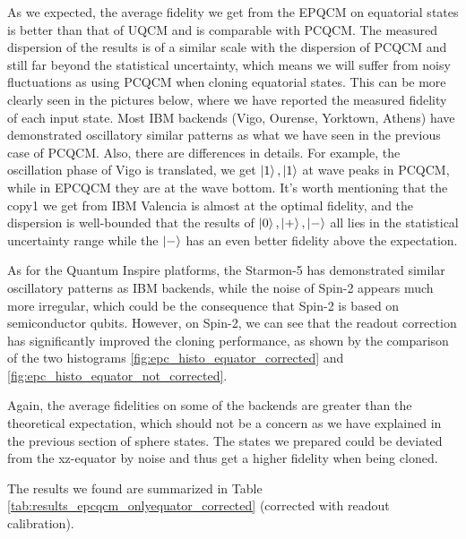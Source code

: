 As we expected, the average fidelity we get from the EPQCM on equatorial states is better than that of UQCM and is comparable with PCQCM.
The measured dispersion of the results is of a similar scale with the dispersion of PCQCM and still far beyond the statistical uncertainty, which means we will suffer from noisy fluctuations as using PCQCM when cloning equatorial states. 
This can be more clearly seen in the pictures below, where we have reported the measured fidelity of each input state. Most IBM backends (Vigo, Ourense, Yorktown, Athens) have demonstrated oscillatory similar patterns as what we have seen in the previous case of PCQCM.
Also, there are differences in details. For example, the oscillation phase of Vigo is translated, we get $\ket{1},\ket{1}$ at wave peaks in PCQCM, while in EPCQCM they are at the wave bottom. It's worth mentioning that the copy1 we get from IBM Valencia is almost at the optimal fidelity, and the dispersion is well-bounded that the results of $\ket{0}, \ket{+}, \ket{-}$ all lies in the statistical uncertainty range while the $\ket{-}$ has an even better fidelity above the expectation. 


As for the Quantum Inspire platforms, the Starmon-5 has demonstrated similar oscillatory patterns as IBM backends, while the noise of Spin-2 appears much more irregular, which could be the consequence that Spin-2 is based on semiconductor qubits. However, on Spin-2, we can see that the readout correction has significantly improved the cloning performance, as shown by the comparison of the two histograms \ref{fig:epc_histo_equator_corrected} and \ref{fig:epc_histo_equator_not_corrected}. 

Again, the average fidelities on some of the backends are greater than the theoretical expectation, which should not be a concern as we have explained in the previous section of sphere states. The states we prepared could be deviated from the xz-equator by noise and thus get a higher fidelity when being cloned.

The results we found are summarized in Table \ref{tab:results_epcqcm_onlyequator_corrected} (corrected with readout calibration).

